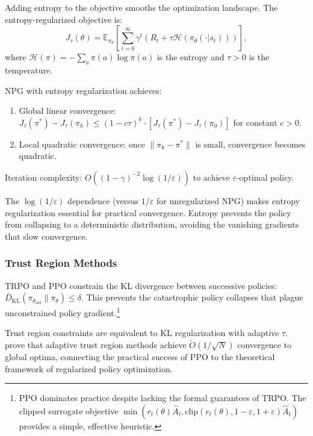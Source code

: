 Adding entropy to the objective smooths the optimization landscape. The entropy-regularized objective is:
\begin{equation}
J_\tau(\theta) = \mathbb{E}_{\pi_\theta}\left[\sum_{t=0}^\infty \gamma^t \left( R_t + \tau \mathcal{H}(\pi_\theta(\cdot|s_t)) \right)\right],
\end{equation}
where $\mathcal{H}(\pi) = -\sum_a \pi(a) \log \pi(a)$ is the entropy and $\tau > 0$ is the temperature.

\begin{theorem}
\label{thm:npg_entropy}
NPG with entropy regularization achieves:
\begin{enumerate}
\item[(a)] Global linear convergence: $J_\tau(\pi^*) - J_\tau(\pi_k) \leq (1 - c\tau)^k \cdot [J_\tau(\pi^*) - J_\tau(\pi_0)]$ for constant $c > 0$.
\item[(b)] Local quadratic convergence: once $\|\pi_k - \pi^*\|$ is small, convergence becomes quadratic.
\end{enumerate}
Iteration complexity: $O((1-\gamma)^{-2} \log(1/\varepsilon))$ to achieve $\varepsilon$-optimal policy.
\end{theorem}

The $\log(1/\varepsilon)$ dependence (versus $1/\varepsilon$ for unregularized NPG) makes entropy regularization essential for practical convergence. Entropy prevents the policy from collapsing to a deterministic distribution, avoiding the vanishing gradients that slow convergence.


\subsubsection{Trust Region Methods}

TRPO \citep{Schulman2015} and PPO \citep{Schulman2017} constrain the KL divergence between successive policies: $\bar{D}_{\mathrm{KL}}(\pi_{\theta_{\text{old}}} \| \pi_\theta) \leq \delta$. This prevents the catastrophic policy collapses that plague unconstrained policy gradient.\footnote{PPO dominates practice despite lacking the formal guarantees of TRPO. The clipped surrogate objective $\min(r_t(\theta)\hat{A}_t, \text{clip}(r_t(\theta), 1-\varepsilon, 1+\varepsilon)\hat{A}_t)$ provides a simple, effective heuristic.}

Trust region constraints are equivalent to KL regularization with adaptive $\tau$. \citet{shani2020} prove that adaptive trust region methods achieve $\tilde{O}(1/\sqrt{N})$ convergence to global optima, connecting the practical success of PPO to the theoretical framework of regularized policy optimization.


